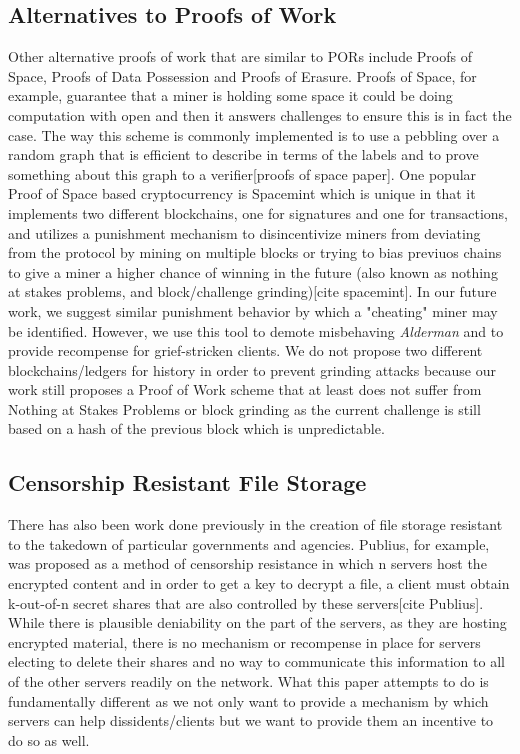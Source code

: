 \documentclass{article}
\begin{document}
\subsection{Alternatives to Proofs of Work}
Other alternative proofs of work that are similar to PORs include Proofs of Space, Proofs of Data Possession and Proofs of Erasure. Proofs of Space, for example, guarantee that a miner is holding some space it could be doing computation with open and then it answers challenges to ensure this is in fact the case. The way this scheme is commonly implemented is to use a pebbling over a random graph that is efficient to describe in terms of the labels and to prove something about this graph to a verifier[proofs of space paper]. One popular Proof of Space based cryptocurrency is Spacemint which is unique in that it implements two different blockchains, one for signatures and one for transactions, and utilizes a punishment mechanism to disincentivize miners from deviating from the protocol by mining on multiple blocks or trying to bias previuos chains to give a miner a higher chance of winning in the future (also known as nothing at stakes problems, and block/challenge grinding)[cite spacemint]. In our future work, we suggest similar punishment behavior by which a "cheating" miner may be identified. However, we use this tool to demote misbehaving \emph{Alderman} and to provide recompense for grief-stricken clients. We do not propose two different blockchains/ledgers for history in order to prevent grinding attacks because our work still proposes a Proof of Work scheme that at least does not suffer from Nothing at Stakes Problems or block grinding as the current challenge is still based on a hash of the previous block which is unpredictable.


\subsection{Censorship Resistant File Storage}
There has also been work done previously in the creation of file storage resistant to the takedown of particular governments and agencies. Publius, for example, was proposed as a method of censorship resistance in which n servers host the encrypted content and in order to get a key to decrypt a file, a client must obtain k-out-of-n secret shares that are also controlled by these servers[cite Publius]. While there is plausible deniability on the part of the servers, as they are hosting encrypted material, there is no mechanism or recompense in place for servers electing to delete their shares and no way to communicate this information to all of the other servers readily on the network. What this paper attempts to do is fundamentally different as we not only want to provide a mechanism by which servers can help dissidents/clients but we want to provide them an incentive to do so as well. 
\end{document}
